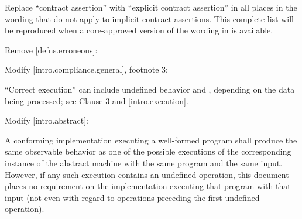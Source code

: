 Replace ``contract assertion'' with ``explicit contract assertion'' in all places in the wording that do not apply to implicit contract assertions.  This complete list will be reproduced when a core-approved version of the wording in \cite{P2900R13} is available.

Remove [defns.erroneous]:

\begin{adjustwidth}{0.5cm}{0.5cm}


\end{adjustwidth}

Modify [intro.compliance.general], footnote 3:

\begin{adjustwidth}{0.5cm}{0.5cm}
“Correct execution” can include undefined behavior and , depending on the data being processed; see Clause 3 and [intro.execution].
\end{adjustwidth}

Modify [intro.abstract]:

\begin{adjustwidth}{0.5cm}{0.5cm}
A conforming implementation executing a well-formed program shall produce the same observable behavior as one of the possible executions of the corresponding instance of the abstract machine with the same program and the same input. However, if any such execution contains an undefined operation, this document places no requirement on the implementation executing that program with that input (not even with regard to operations preceding the first undefined operation). 


\end{adjustwidth}

